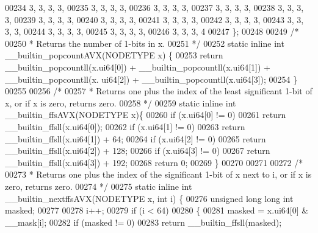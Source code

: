 \begin{DoxyCode}
00234         3, 3, 3, 3,
00235         3, 3, 3, 3,
00236         3, 3, 3, 3,
00237         3, 3, 3, 3,
00238         3, 3, 3, 3,
00239         3, 3, 3, 3,
00240         3, 3, 3, 3,
00241         3, 3, 3, 3,
00242         3, 3, 3, 3,
00243         3, 3, 3, 3,
00244         3, 3, 3, 3,
00245         3, 3, 3, 3,
00246         3, 3, 3, 4
00247 \};
00248 
00249 \textcolor{comment}{/*}
00250 \textcolor{comment}{ * Returns the number of 1-bits in x.}
00251 \textcolor{comment}{ */}
00252 \textcolor{keyword}{static} \textcolor{keyword}{inline} \textcolor{keywordtype}{int} \_\_builtin\_popcountAVX(NODETYPE x) \{
00253         \textcolor{keywordflow}{return} \_\_builtin\_popcountll(x.ui64[0]) + \_\_builtin\_popcountll(x.ui64[1]) + \_\_builtin\_popcountll(x.
      ui64[2]) + \_\_builtin\_popcountll(x.ui64[3]);
00254 \}
00255 
00256 \textcolor{comment}{/*}
00257 \textcolor{comment}{ * Returns one plus the index of the least significant 1-bit of x, or if x is zero, returns zero.}
00258 \textcolor{comment}{ */}
00259 \textcolor{keyword}{static} \textcolor{keyword}{inline} \textcolor{keywordtype}{int} \_\_builtin\_ffsAVX(NODETYPE x)\{
00260         \textcolor{keywordflow}{if} (x.ui64[0] != 0)
00261                 \textcolor{keywordflow}{return} \_\_builtin\_ffsll(x.ui64[0]);
00262         \textcolor{keywordflow}{if} (x.ui64[1] != 0)
00263                 \textcolor{keywordflow}{return} \_\_builtin\_ffsll(x.ui64[1]) + 64;
00264         \textcolor{keywordflow}{if} (x.ui64[2] != 0)
00265                 \textcolor{keywordflow}{return} \_\_builtin\_ffsll(x.ui64[2]) + 128;
00266         \textcolor{keywordflow}{if} (x.ui64[3] != 0)
00267                 \textcolor{keywordflow}{return} \_\_builtin\_ffsll(x.ui64[3]) + 192;
00268         \textcolor{keywordflow}{return} 0;
00269 \}
00270 
00271 
00272 \textcolor{comment}{/*}
00273 \textcolor{comment}{ * Returns one plus the index of the significant 1-bit of x next to i, or if x is zero, returns zero.}
00274 \textcolor{comment}{ */}
00275 \textcolor{keyword}{static} \textcolor{keyword}{inline} \textcolor{keywordtype}{int} \_\_builtin\_nextffsAVX(NODETYPE x, \textcolor{keywordtype}{int} i) \{
00276         \textcolor{keywordtype}{unsigned} \textcolor{keywordtype}{long} \textcolor{keywordtype}{long} \textcolor{keywordtype}{int} masked;
00277 
00278         i++;
00279         \textcolor{keywordflow}{if} (i < 64)
00280         \{
00281                 masked = x.ui64[0] & \_\_mask[i];
00282                 \textcolor{keywordflow}{if} (masked != 0)
00283                         \textcolor{keywordflow}{return} \_\_builtin\_ffsll(masked);

\end{DoxyCode}
